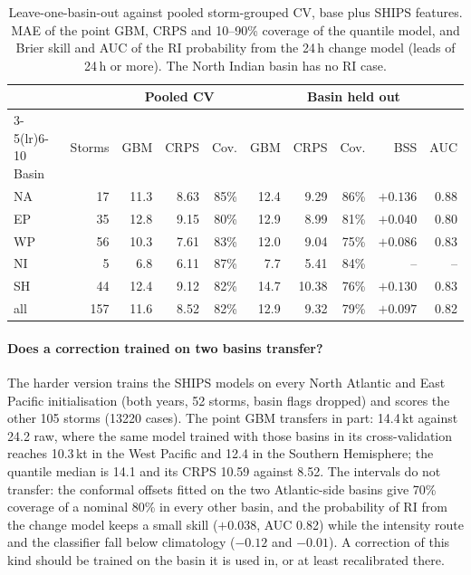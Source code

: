 \documentclass[11pt]{article}
\begin{document}
\begin{table}[t]
\centering
\caption{Leave-one-basin-out against pooled storm-grouped CV, base plus SHIPS features. MAE of
the point GBM, CRPS and 10--90\% coverage of the quantile model, and Brier skill and AUC of the
RI probability from the 24\,h change model (leads of 24\,h or more). The North Indian basin has
no RI case.}
\label{tab:lobo}
\begin{tabular}{lrrrrrrrrr}
\toprule
 & & \multicolumn{3}{c}{Pooled CV} & \multicolumn{5}{c}{Basin held out} \\
\cmidrule(lr){3-5}\cmidrule(lr){6-10}
Basin & Storms & GBM & CRPS & Cov. & GBM & CRPS & Cov. & BSS & AUC \\
\midrule
NA  &  17 & 11.3 & 8.63 & 85\% & 12.4 &  9.29 & 86\% & $+0.136$ & 0.88 \\
EP  &  35 & 12.8 & 9.15 & 80\% & 12.9 &  8.99 & 81\% & $+0.040$ & 0.80 \\
WP  &  56 & 10.3 & 7.61 & 83\% & 12.0 &  9.04 & 75\% & $+0.086$ & 0.83 \\
NI  &   5 &  6.8 & 6.11 & 87\% &  7.7 &  5.41 & 84\% & --       & --   \\
SH  &  44 & 12.4 & 9.12 & 82\% & 14.7 & 10.38 & 76\% & $+0.130$ & 0.83 \\
all & 157 & 11.6 & 8.52 & 82\% & 12.9 &  9.32 & 79\% & $+0.097$ & 0.82 \\
\bottomrule
\end{tabular}
\end{table}

\paragraph{Does a correction trained on two basins transfer?} The harder version trains the SHIPS models
on every North Atlantic and East Pacific initialisation (both years, 52 storms, basin flags
dropped) and scores the other 105 storms (13220 cases). The point GBM transfers in part: 14.4\,kt
against 24.2 raw, where the same model trained with those basins in its cross-validation reaches
10.3\,kt in the West Pacific and 12.4 in the Southern Hemisphere; the quantile median is 14.1 and
its CRPS 10.59 against 8.52. The intervals do not transfer: the conformal offsets fitted on the
two Atlantic-side basins give 70\% coverage of a nominal 80\% in every other basin, and the
probability of RI from the change model keeps a small skill ($+0.038$, AUC 0.82) while the
intensity route and the classifier fall below climatology ($-0.12$ and $-0.01$). A correction
of this kind should be trained on the basin it is used in, or at least recalibrated there.
\end{document}
